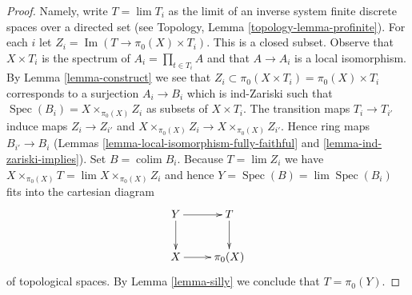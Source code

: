 \documentclass[10pt,a4paper]{amsart}
\theoremstyle{plain}
\theoremstyle{definition}
\theoremstyle{remark}
\numberwithin{equation}{subsection}
\def\lim{\mathop{\mathrm{lim}}\nolimits}
\def\colim{\mathop{\mathrm{colim}}\nolimits}
\def\Spec{\mathop{\mathrm{Spec}}}
\def\Im{\mathop{\mathrm{Im}}}
\begin{document}
\begin{proof}
Namely, write $T = \lim T_i$ as the limit of an inverse system finite
discrete spaces over a directed set (see
Topology, Lemma \ref{topology-lemma-profinite}). For each $i$ let
$Z_i = \Im(T \to \pi_0(X) \times T_i)$. This is a closed subset.
Observe that $X \times T_i$ is the spectrum of $A_i = \prod_{t \in T_i} A$
and that $A \to A_i$ is a local isomorphism. By Lemma \ref{lemma-construct}
we see that $Z_i \subset \pi_0(X \times T_i) = \pi_0(X) \times T_i$
corresponds to a surjection $A_i \to B_i$ which is ind-Zariski
such that $\Spec(B_i) = X \times_{\pi_0(X)} Z_i$ as subsets of
$X \times T_i$. The transition maps $T_i \to T_{i'}$ induce maps
$Z_i \to Z_{i'}$ and $X \times_{\pi_0(X)} Z_i \to X \times_{\pi_0(X)} Z_{i'}$.
Hence ring maps $B_{i'} \to B_i$
(Lemmas \ref{lemma-local-isomorphism-fully-faithful} and
\ref{lemma-ind-zariski-implies}).
Set $B = \colim B_i$. Because $T = \lim Z_i$ we have
$X \times_{\pi_0(X)} T = \lim  X \times_{\pi_0(X)} Z_i$
and hence $Y = \Spec(B) = \lim \Spec(B_i)$
fits into the cartesian diagram
$$
\xymatrix{
Y \ar[r] \ar[d] & T \ar[d] \\
X \ar[r] & \pi_0(X)
}
$$
of topological spaces. By Lemma \ref{lemma-silly}
we conclude that $T = \pi_0(Y)$.
\end{proof}
\end{document}
